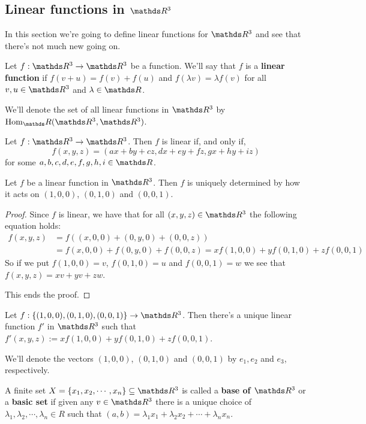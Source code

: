 \newpage
\subsection{Linear functions in $\R^3$}

In this section we're going to define linear functions for $\R^3$ and see that there's not much new going on.

\begin{df}
	Let $f:\R^3\to \R^3$ be a function. We'll say that $f$ is a \textbf{linear function} if $f(v+u)=f(v)+f(u)$ and $f(\lambda v)=\lambda f(v)$ for all $v,u\in \R^3$ and $\lambda\in \R$.
	
	We'll denote the set of all linear functions in $\R^3$ by $\hom_\R(\R^3,\R^3)$.
\end{df}

\begin{prop}
	Let $f:\R^3\to\R^3$. Then $f$ is linear if, and only if, $$f(x,y,z)=(ax+by+cz,dx+ey+fz,gx+hy+iz)$$ for some $a,b,c,d,e,f,g,h,i\in\R$.
\end{prop}

\begin{lemma}
	Let $f$ be a linear function in $\R^3$. Then $f$ is uniquely determined by how it acts on $(1,0,0)$, $(0,1,0)$ and $(0,0,1)$.
\end{lemma}
\begin{proof}
	Since $f$ is linear, we have that for all $(x,y,z)\in\R^3$ the following equation holds:
	\begin{align*}
	f(x,y,z)&=f((x,0,0)+(0,y,0)+(0,0,z))\\
	&=f(x,0,0)+f(0,y,0)+f(0,0,z)=xf(1,0,0)+yf(0,1,0)+zf(0,0,1)
	\end{align*}So if we put $f(1,0,0)=v$, $f(0,1,0)=u$ and $f(0,0,1)=w$ we see that $f(x,y,z)=xv+yv+zw$.
	
	This ends the proof.
\end{proof}
\begin{cor}
	Let $f:\{(1,0,0),(0,1,0),(0,0,1)\}\to\R^3$. Then there's a unique linear function $f'$ in $\R^3$ such that $f'(x,y,z):=xf(1,0,0)+yf(0,1,0)+zf(0,0,1)$.
\end{cor}

\begin{df}
	We'll denote the vectors $(1,0,0)$, $(0,1,0)$ and $(0,0,1)$ by $e_1,e_2$ and $e_3$, respectively.
\end{df}
\begin{df}
	A finite set $X=\{x_1,x_2,\cdots, x_n\}\subseteq \R^3$ is called a \textbf{base of $\R^3$} or a \textbf{basic set} if given any $v\in \R^3$ there is a unique choice of $\lambda_1,\lambda_2,\cdots,\lambda_n\in R$ such that $(a,b)=\lambda_1x_1+\lambda_2x_2+\cdots+\lambda_n x_n$.
\end{df}

